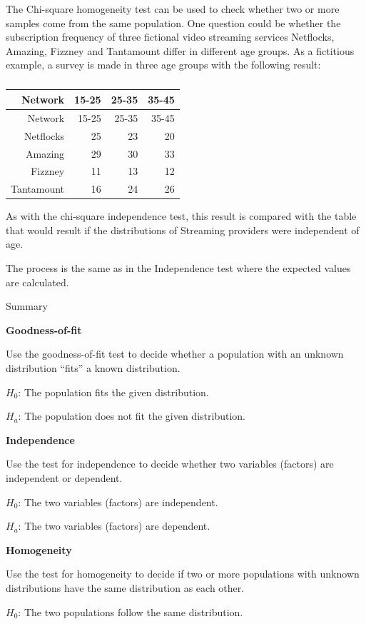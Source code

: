 \documentclass[
]{book}
\begin{document}
The Chi-square homogeneity test can be used to check whether two or more samples come from the same population. One question could be whether the subscription frequency of three fictional video streaming services Netflocks, Amazing, Fizzney and Tantamount differ in different age groups. As a fictitious example, a survey is made in three age groups with the following result:

\begin{longtable}[]{@{}rrrr@{}}
\caption{\label{tab:table18}}\tabularnewline
\toprule
Network & 15-25 & 25-35 & 35-45 \\
\midrule
\endfirsthead
\toprule
Network & 15-25 & 25-35 & 35-45 \\
\midrule
\endhead
Netflocks & 25 & 23 & 20 \\
Amazing & 29 & 30 & 33 \\
Fizzney & 11 & 13 & 12 \\
Tantamount & 16 & 24 & 26 \\
\bottomrule
\end{longtable}

As with the chi-square independence test, this result is compared with the table that would result if the distributions of Streaming providers were independent of age.

The process is the same as in the Independence test where the expected values are calculated.

Summary

\textbf{Goodness-of-fit}

Use the goodness-of-fit test to decide whether a population with an unknown distribution ``fits'' a known distribution.

\(H_0\): The population fits the given distribution.

\(H_a\): The population does not fit the given distribution.

\textbf{Independence}

Use the test for independence to decide whether two variables (factors) are independent or dependent.

\(H_0\): The two variables (factors) are independent.

\(H_a\): The two variables (factors) are dependent.

\textbf{Homogeneity}

Use the test for homogeneity to decide if two or more populations with unknown distributions have the same distribution as each other.

\(H_0\): The two populations follow the same distribution.
\end{document}

